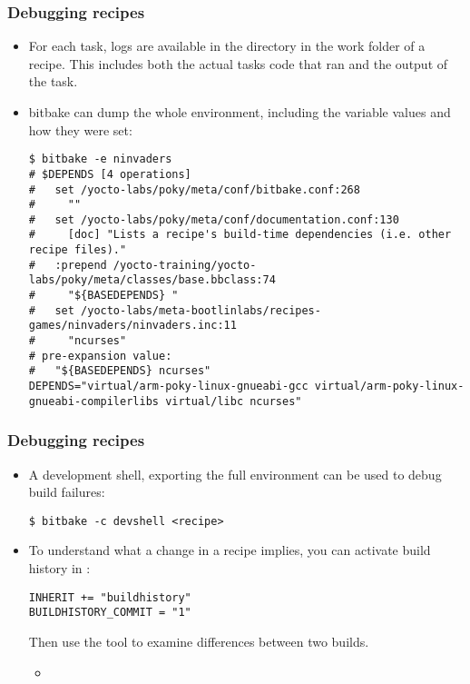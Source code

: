 \begin{frame}[fragile]
  \frametitle{Debugging recipes}
  \begin{itemize}
    \item For each task, logs are available in the 
      directory in the work folder of a recipe. This includes both
      the actual tasks code that ran and the output of the task.
    \item bitbake can dump the whole environment, including the
      variable values and how they were set:
      \begin{block}{}
        \begin{verbatim}
$ bitbake -e ninvaders
# $DEPENDS [4 operations]
#   set /yocto-labs/poky/meta/conf/bitbake.conf:268
#     ""
#   set /yocto-labs/poky/meta/conf/documentation.conf:130
#     [doc] "Lists a recipe's build-time dependencies (i.e. other recipe files)."
#   :prepend /yocto-training/yocto-labs/poky/meta/classes/base.bbclass:74
#     "${BASEDEPENDS} "
#   set /yocto-labs/meta-bootlinlabs/recipes-games/ninvaders/ninvaders.inc:11
#     "ncurses"
# pre-expansion value:
#   "${BASEDEPENDS} ncurses"
DEPENDS="virtual/arm-poky-linux-gnueabi-gcc virtual/arm-poky-linux-gnueabi-compilerlibs virtual/libc ncurses"
        \end{verbatim}
      \end{block}

  \end{itemize}
\end{frame}

\begin{frame}[fragile]
  \frametitle{Debugging recipes}
  \begin{itemize}
    \item A development shell, exporting the full environment can be
      used to debug build failures:
      \begin{block}{}
        \begin{verbatim}
$ bitbake -c devshell <recipe>
        \end{verbatim}
      \end{block}
    \item To understand what a change in a recipe implies, you can
      activate build history in :
      \begin{block}{}
        \begin{verbatim}
INHERIT += "buildhistory"
BUILDHISTORY_COMMIT = "1"
        \end{verbatim}
      \end{block}
      Then use the  tool to examine
      differences between two builds.
      \begin{itemize}
        \item {}
      \end{itemize}
  \end{itemize}
\end{frame}


